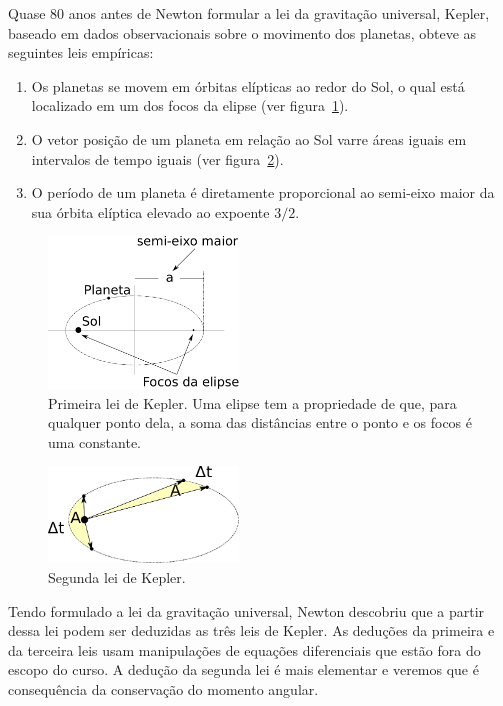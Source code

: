 \documentclass[twocolumn=on,fontsize=12pt,DIV=calc]{scrartcl}
\theoremstyle{definition}
\begin{document}
Quase 80 anos antes de Newton formular a lei da gravitação universal,
Kepler, baseado em dados observacionais sobre o movimento dos
planetas, obteve as seguintes leis empíricas:
\begin{enumerate}
\item Os planetas se movem em órbitas elípticas ao redor do Sol, o
  qual está localizado em um dos focos da elipse (ver
  figura~\ref{fig:orbitaeliptica}).
\item O vetor posição de um planeta em relação ao Sol varre áreas
  iguais em intervalos de tempo iguais (ver
  figura~\ref{fig:leikepler2}).
\item O período de um planeta é diretamente proporcional ao semi-eixo
  maior da sua órbita elíptica elevado ao expoente $3/2$.
\end{enumerate}
\begin{figure}[ht]
  \centering
  \includegraphics[width=0.45\textwidth,keepaspectratio]{aux/orbitaeliptica.pdf}
  \caption{Primeira lei de Kepler. Uma elipse tem a propriedade de
    que, para qualquer ponto dela, a soma das distâncias entre o ponto
    e os focos é uma constante.}
  \label{fig:orbitaeliptica}
\end{figure}
\begin{figure}[ht]
  \centering
  \includegraphics[width=0.45\textwidth,keepaspectratio]{aux/leikepler2.pdf}
  \caption{Segunda lei de Kepler.}
  \label{fig:leikepler2}
\end{figure}

Tendo formulado a lei da gravitação universal, Newton descobriu que a
partir dessa lei podem ser deduzidas as três leis de Kepler. As
deduções da primeira e da terceira leis usam manipulações de equações
diferenciais que estão fora do escopo do curso. A dedução da segunda
lei é mais elementar e veremos que é consequência da conservação do
momento angular.
\end{document}
